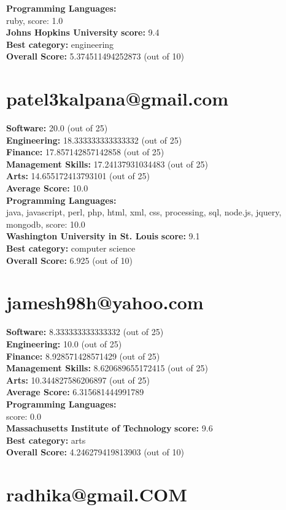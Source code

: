\documentclass{article}
\begin{document}
\textbf{Programming Languages:} \\
ruby, score: 1.0\\
\textbf{Johns Hopkins University} \textbf{score:} 9.4\\
\textbf{Best category: } engineering\\
\textbf{Overall Score: }5.374511494252873 (out of 10)\section{patel3kalpana@gmail.com}
\textbf{Software:} 20.0 (out of 25)\\
\textbf{Engineering: } 18.333333333333332 (out of 25)\\
\textbf{Finance:} 17.857142857142858 (out of 25)\\
\textbf{Management Skills:} 17.24137931034483 (out of 25)\\
\textbf{Arts:} 14.655172413793101 (out of 25)\\
\textbf{Average Score: } 10.0\\
\textbf{Programming Languages:} \\
java, javascript, perl, php, html, xml, css, processing, sql, node.js, jquery, mongodb, score: 10.0\\
\textbf{Washington University in St. Louis} \textbf{score:} 9.1\\
\textbf{Best category: } computer science\\
\textbf{Overall Score: }6.925 (out of 10)\section{jamesh98h@yahoo.com}
\textbf{Software:} 8.333333333333332 (out of 25)\\
\textbf{Engineering: } 10.0 (out of 25)\\
\textbf{Finance:} 8.928571428571429 (out of 25)\\
\textbf{Management Skills:} 8.620689655172415 (out of 25)\\
\textbf{Arts:} 10.344827586206897 (out of 25)\\
\textbf{Average Score: } 6.315681444991789\\
\textbf{Programming Languages:} \\
score: 0.0\\
\textbf{Massachusetts Institute of Technology} \textbf{score:} 9.6\\
\textbf{Best category: } arts\\
\textbf{Overall Score: }4.246279419813903 (out of 10)\section{radhika@gmail.COM}
\end{document}
